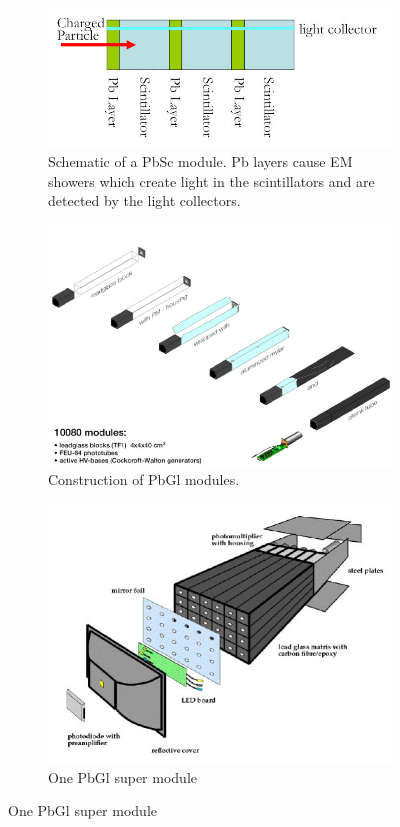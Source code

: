 \begin{figure}
\centering
\begin{subfigure}[p]{0.5\textwidth}
    \centering
    \includegraphics[width=\textwidth]{Figures/PbScschematic.jpg}\ssp
    \caption{Schematic of a PbSc module. Pb layers cause EM showers which create light in the scintillators and are detected by the light collectors.}

\end{subfigure}
\begin{subfigure}[b]{0.6\textwidth}
    \centering
    \includegraphics[width=\textwidth]{Figures/PbGlmodules.jpg}
    \caption{Construction of PbGl modules.}

\end{subfigure}
\begin{subfigure}[b]{0.6\textwidth}
    \centering
    \includegraphics[width=\textwidth]{Figures/pbglsupermodule.JPG}
    \caption{One PbGl super module}


\end{subfigure}
\end{figure}
